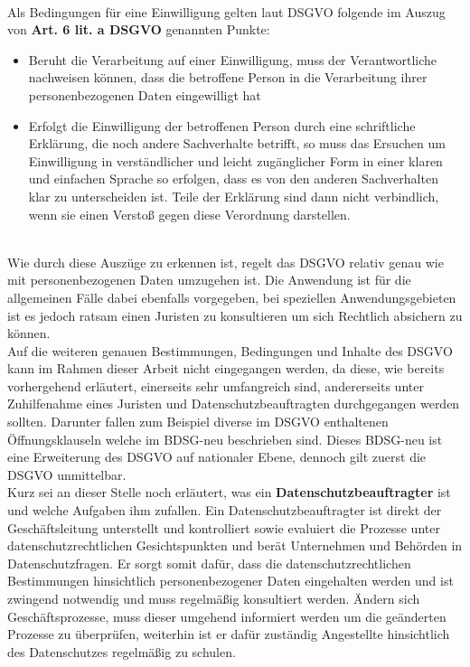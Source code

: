 \documentclass[a4paper, 12pt]{article}
\begin{document}
\cite{noauthor_datenschutz-grundverordnung_nodate}\\
Als Bedingungen für eine Einwilligung gelten laut DSGVO folgende im Auszug von \textbf{Art. 6 lit. a DSGVO} genannten Punkte:
\begin{itemize}
	\item Beruht die Verarbeitung auf einer Einwilligung, muss der Verantwortliche nachweisen können, dass die betroffene Person in die Verarbeitung ihrer personenbezogenen Daten eingewilligt hat
	\item Erfolgt die Einwilligung der betroffenen Person durch eine schriftliche Erklärung, die noch andere Sachverhalte betrifft, so muss das Ersuchen um Einwilligung in verständlicher und leicht zugänglicher Form in einer klaren und einfachen Sprache so erfolgen, dass es von den anderen Sachverhalten klar zu unterscheiden ist. Teile der Erklärung sind dann nicht verbindlich, wenn sie einen Verstoß gegen diese Verordnung darstellen.
\end{itemize}
\cite{noauthor_datenschutz-grundverordnung_nodate}\\
Wie durch diese Auszüge zu erkennen ist, regelt das DSGVO relativ genau wie mit personenbezogenen Daten umzugehen ist. Die Anwendung ist für die allgemeinen Fälle dabei ebenfalls vorgegeben, bei speziellen Anwendungsgebieten ist es jedoch ratsam einen Juristen zu konsultieren um sich Rechtlich absichern zu können.\\

\noindent Auf die weiteren genauen Bestimmungen, Bedingungen und Inhalte des DSGVO kann im Rahmen dieser Arbeit nicht eingegangen werden, da diese, wie bereits vorhergehend erläutert, einerseits sehr umfangreich sind, andererseits unter Zuhilfenahme eines Juristen und Datenschutzbeauftragten durchgegangen werden sollten. Darunter fallen zum Beispiel diverse im DSGVO enthaltenen Öffnungsklauseln welche im BDSG-neu beschrieben sind. Dieses BDSG-neu ist eine Erweiterung des DSGVO auf nationaler Ebene, dennoch gilt zuerst die DSGVO unmittelbar.\cite{datenschutz_dsgvo,noauthor_datenschutz-grundverordnung_nodate}\\

\noindent Kurz sei an dieser Stelle noch erläutert, was ein \textbf{Datenschutzbeauftragter} ist und welche Aufgaben ihm zufallen. Ein Datenschutzbeauftragter ist direkt der Geschäftsleitung unterstellt und kontrolliert sowie evaluiert die Prozesse unter datenschutzrechtlichen Gesichtspunkten und berät Unternehmen und Behörden in Datenschutzfragen. Er sorgt somit dafür, dass die datenschutzrechtlichen Bestimmungen hinsichtlich personenbezogener Daten eingehalten werden und ist zwingend notwendig und muss regelmäßig konsultiert werden. Ändern sich Geschäftsprozesse, muss dieser umgehend informiert werden um die geänderten Prozesse zu überprüfen, weiterhin ist er dafür zuständig Angestellte hinsichtlich des Datenschutzes regelmäßig zu schulen.\cite{datenschutz_beauftragter}
\end{document}
